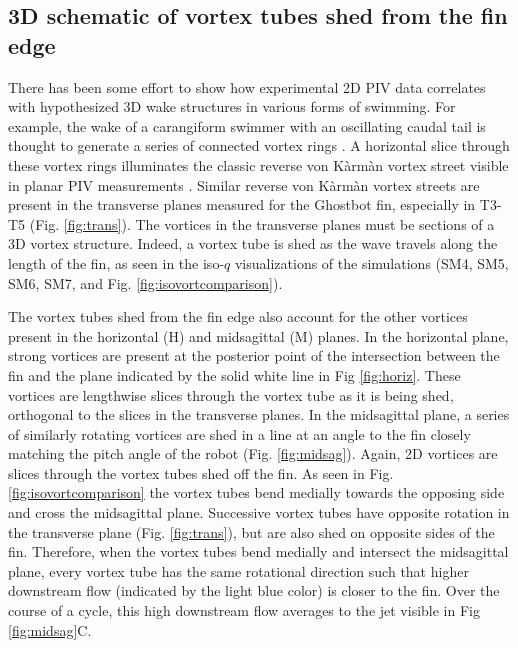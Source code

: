 \documentclass[onecolumn]{IEEEtran}
\begin{document}
\subsection{3D schematic of vortex tubes shed from the fin edge}

There has been some effort to show how experimental 2D PIV data correlates 
with hypothesized 3D wake structures in various forms of swimming.
For example, the wake of a carangiform swimmer with an oscillating caudal
tail is thought to generate a series of connected vortex rings \citep*{Naue02b}. A horizontal slice
through these vortex rings illuminates the classic reverse von K\`arm\`an
vortex street visible in planar PIV measurements \citep*{Naue02b}. Similar reverse von
K\`arm\`an vortex streets are present in the transverse planes measured
for the Ghostbot fin, especially in T3-T5 (Fig. \ref{fig:trans}). The vortices in the transverse planes
must be sections of a 3D vortex structure. Indeed, a vortex tube is shed
as the wave travels along the length of the fin, as seen in the
iso-$q$ visualizations of the simulations (SM4, SM5, SM6, SM7, and Fig. \ref{fig:isovortcomparison}).

The vortex tubes shed from the fin edge also account for the other vortices present in the
horizontal (H) and midsagittal (M) planes. In the horizontal plane, strong
vortices are present at the posterior point of the intersection between
the fin and the plane indicated by the solid white line in Fig \ref{fig:horiz}. 
These vortices are lengthwise slices through the vortex tube
as it is being shed, orthogonal to the slices in the
transverse planes. In the midsagittal plane, a series of similarly
rotating vortices are shed in a line at an angle to the fin closely
matching the pitch angle of the robot (Fig. \ref{fig:midsag}). Again, 2D vortices are slices
through the vortex tubes shed off the fin. As seen in Fig.
\ref{fig:isovortcomparison} the vortex tubes bend medially towards the opposing side and cross the midsagittal plane.
Successive vortex tubes have opposite rotation in the transverse plane (Fig. \ref{fig:trans}), but are also shed on
opposite sides of the fin. Therefore, when the vortex tubes bend medially and intersect the midsagittal
plane, every vortex tube has the same rotational direction such that higher
downstream flow (indicated by the light blue color) is closer to the fin. Over the course of a cycle, this
high downstream flow averages to the jet visible in Fig \ref{fig:midsag}C.
\end{document}
